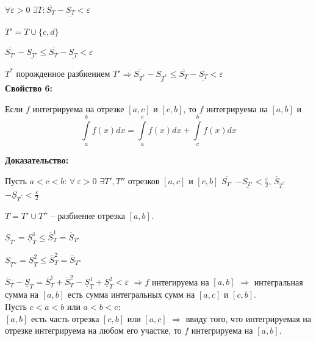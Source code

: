 \documentclass[a4paper,12pt]{article} %
\begin{document}
$\forall \varepsilon > 0 \; \exists T: \overline{S_T}- \underline{S_T}< \varepsilon$

$T' = T \cup \{c,d\}$

$\overline{S_{T'}}-\underline{S_{T'}}\leq \overline{S_T}-\underline{S_T} < \varepsilon$

$T^*$ порожденное разбиением $T' \Rightarrow \overline{S_{T^*}}- \underline{S_{T^*}}\leq  \overline{S_T}-\underline{S_T} < \varepsilon$\\

\textbf{Свойство 6:}

Если $ f $ интегрируема на отрезке $ [a, c]  $ и $ [c, b]  $, то $ f $ интегрируема на $ [a, b]  $ и \vspace*{1mm} \hspace*{50mm} $$\int\limits_a^b f(x)dx = \int\limits_a^c f(x)dx + \int\limits_c^b f(x)dx $$

\textbf{Доказательство:}

Пусть $ a < c < b$: $ \forall ~ \varepsilon > 0$ \hspace*{1mm}  $\exists T', T'' $ отрезков $ [a, c] $ и $ [c, b]  $ \hspace*{1mm}  $\overline{S_{T'}}$ $ - {\underline{S_{T'}}}  < \frac{\varepsilon}{2} $, \hspace*{2mm}  
\vspace*{1mm}
$\overline {S}_{T^{''}}$ $ - {\underline{S}_{T^{''}}}  <  {\frac{\varepsilon}{2}} $

$T = T' \cup T{''}$ -- разбиение отрезка $ [a,b] $.

$ \underline{S}_{T'} =  \underline{S}_{T}^1 \leq \overline{S}_{T}^1 = \overline{S}_{T'} $

$ \underline{S}_{T''} =  \underline{S}_{T}^2 \leq \overline{S}_{T}^2 = \overline{S}_{T''} $

$ \overline{S}_{T} -  \underline{S}_{T} = \overline{S}_{T}^1 + \overline{S}_{T}^2 - \underline{S}_{T}^1 + \underline{S}_{T}^2 < \varepsilon $ $ \Rightarrow f $ интегируема на $ [a, b]$ $ \Rightarrow $ интегральная сумма на $ [a, b] $ есть сумма интегральных сумм на $ [a,c] $ и $ [c, b] $.\\

Пусть $ c < a < b $ или $ a < b < c $: \\[2 mm]
$ [a, b] $ есть часть отрезка $ [c, b] $ или $ [a, c] $ $ \Rightarrow $ ввиду того, что интегрируемая на отрезке интегрируема на любом его участке, то $ f $ интегрируема на $ [a, b] $. \\
\end{document}
